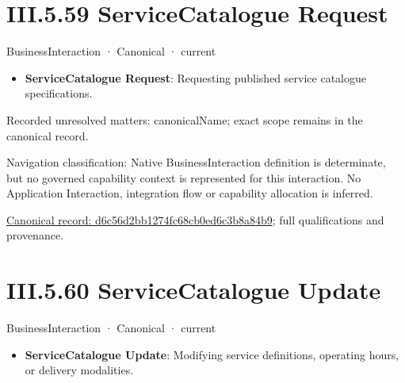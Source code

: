 \section*{III.5.59 ServiceCatalogue Request}
\label{navigation:III.5.59}

\label{element:d6c56d2bb1274fc68cb0ed6c3b8a84b9}
{\small BusinessInteraction · Canonical · current}\par

\begin{itemize}


\item \textbf{ServiceCatalogue Request}: Requesting published service catalogue specifications.

\end{itemize}

{\small Recorded unresolved matters: canonicalName; exact scope remains in the canonical record.}\par
{\small Navigation classification: Native BusinessInteraction definition is determinate, but no governed capability context is represented for this interaction. No Application Interaction, integration flow or capability allocation is inferred.}\par
{\footnotesize \href{../../../../../../../../continuum/business/business-interaction/d6c56d2bb1274fc68cb0ed6c3b8a84b9.md}{Canonical record: d6c56d2bb1274fc68cb0ed6c3b8a84b9}; full qualifications and provenance.}\par
\section*{III.5.60 ServiceCatalogue Update}
\label{navigation:III.5.60}

\label{element:c15051a06c1a46b1acb75d18a5e728dd}
{\small BusinessInteraction · Canonical · current}\par

\begin{itemize}


\item \textbf{ServiceCatalogue Update}: Modifying service definitions, operating hours, or delivery modalities.

\end{itemize}


